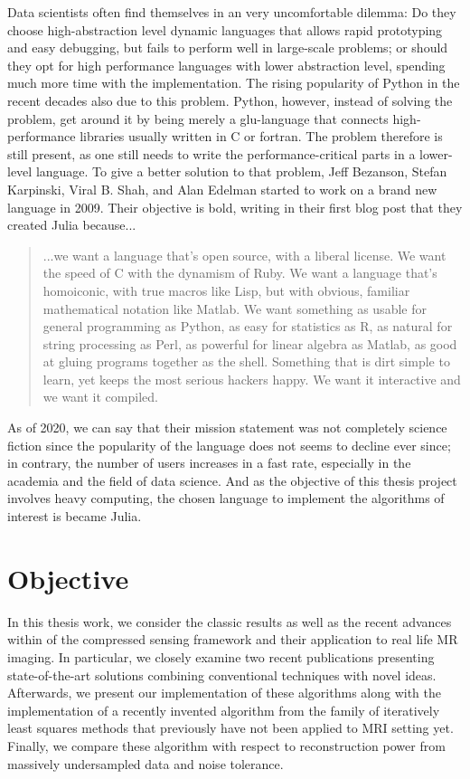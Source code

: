 Data scientists often find themselves in an very uncomfortable dilemma: Do they choose high-abstraction level dynamic languages that allows rapid prototyping and easy debugging, but fails to perform well in large-scale problems; or should they opt for high performance languages with lower abstraction level, spending much more time with the implementation. The rising popularity of Python in the recent decades also due to this problem. Python, however, instead of solving the problem, get around it by being merely a glu-language that connects high-performance libraries usually written in C or fortran. The problem therefore is still present, as one still needs to write the performance-critical parts in a lower-level language. To give a better solution to that problem, Jeff Bezanson, Stefan Karpinski, Viral B. Shah, and Alan Edelman started to work on a brand new language in 2009. Their objective is bold, writing in their first blog post that they created Julia because...
\begin{quote}
...we want a language that's open source, with a liberal license. We want the speed of C with the dynamism of Ruby. We want a language that's homoiconic, with true macros like Lisp, but with obvious, familiar mathematical notation like Matlab. We want something as usable for general programming as Python, as easy for statistics as R, as natural for string processing as Perl, as powerful for linear algebra as Matlab, as good at gluing programs together as the shell. Something that is dirt simple to learn, yet keeps the most serious hackers happy. We want it interactive and we want it compiled.~\cite{bezanson_why_2012}
\end{quote}

As of 2020, we can say that their mission statement was not completely science fiction since the popularity of the language does not seems to decline ever since; in contrary, the number of users increases in a fast rate, especially in the academia and the field of data science. And as the objective of this thesis project involves heavy computing, the chosen language to implement the algorithms of interest is became Julia.

\section{Objective}

In this thesis work, we consider the classic results as well as the recent advances within of the compressed sensing framework and their application to real life MR imaging. In particular, we closely examine two recent publications presenting state-of-the-art solutions combining conventional techniques with novel ideas. Afterwards, we present our implementation of these algorithms along with the implementation of a recently invented algorithm from the family of iteratively least squares methods that previously have not been applied to MRI setting yet. Finally, we compare these algorithm with respect to reconstruction power from massively undersampled data and noise tolerance.

